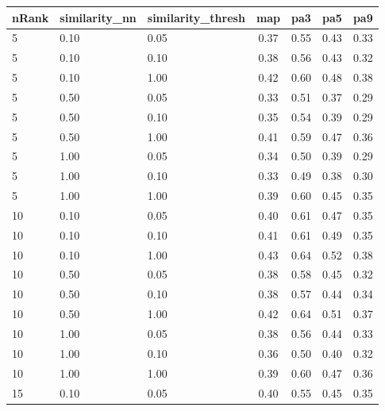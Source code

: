 \documentclass[12pt,a4paper,fleqn]{tufte-handout}
\begin{document}
 
\begin{table}                          
\begin{center}                          
\scriptsize                          
\setlength{\tabcolsep}{.16667em}                          
\begin{tabular}{lllcccc}                          
nRank & similarity\_nn & similarity\_thresh & map & pa3 & pa5 & pa9 \\                          
\hline                          
5 & 0.10 & 0.05 & 0.37 & 0.55 & 0.43 & 0.33 \\                          
5 & 0.10 & 0.10 & 0.38 & 0.56 & 0.43 & 0.32 \\                          
5 & 0.10 & 1.00 & 0.42 & 0.60 & 0.48 & 0.38 \\                          
5 & 0.50 & 0.05 & 0.33 & 0.51 & 0.37 & 0.29 \\                          
5 & 0.50 & 0.10 & 0.35 & 0.54 & 0.39 & 0.29 \\                          
5 & 0.50 & 1.00 & 0.41 & 0.59 & 0.47 & 0.36 \\                          
5 & 1.00 & 0.05 & 0.34 & 0.50 & 0.39 & 0.29 \\                          
5 & 1.00 & 0.10 & 0.33 & 0.49 & 0.38 & 0.30 \\                          
5 & 1.00 & 1.00 & 0.39 & 0.60 & 0.45 & 0.35 \\                          
10 & 0.10 & 0.05 & 0.40 & 0.61 & 0.47 & 0.35 \\                          
10 & 0.10 & 0.10 & 0.41 & 0.61 & 0.49 & 0.35 \\                          
10 & 0.10 & 1.00 & 0.43 & 0.64 & 0.52 & 0.38 \\                          
10 & 0.50 & 0.05 & 0.38 & 0.58 & 0.45 & 0.32 \\                          
10 & 0.50 & 0.10 & 0.38 & 0.57 & 0.44 & 0.34 \\                          
10 & 0.50 & 1.00 & 0.42 & 0.64 & 0.51 & 0.37 \\                          
10 & 1.00 & 0.05 & 0.38 & 0.56 & 0.44 & 0.33 \\                          
10 & 1.00 & 0.10 & 0.36 & 0.50 & 0.40 & 0.32 \\                          
10 & 1.00 & 1.00 & 0.39 & 0.60 & 0.47 & 0.36 \\                          
15 & 0.10 & 0.05 & 0.40 & 0.55 & 0.45 & 0.35 \\                          

\end{tabular}
\end{center}
\end{table}
\end{document}
